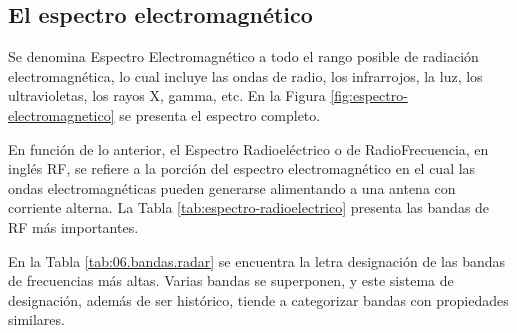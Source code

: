 \begin{description}




\end{description}


\subsection{El espectro electromagn\'etico}

Se denomina Espectro Electromagn\'etico a todo el rango posible de radiaci\'on electromagn\'etica, lo cual incluye las ondas de radio, los infrarrojos, la luz, los ultravioletas, los rayos X, gamma, etc.
  En la Figura \ref{fig:espectro-electromagnetico} se presenta el espectro completo.

En funci\'on de lo anterior, el Espectro Radioel\'ectrico o de RadioFrecuencia, 
 en ingl\'es \ac{RF},
 se refiere a la porci\'on del espectro electromagn\'etico en el cual las ondas electromagn\'eticas pueden generarse alimentando a una antena con corriente alterna. La Tabla \ref{tab:espectro-radioelectrico}   presenta las bandas de RF m\'as importantes.

 En la Tabla \ref{tab:06.bandas.radar} se encuentra la letra designación de las bandas de frecuencias más altas. Varias bandas se superponen, y este sistema de designación, además de ser
histórico, tiende a categorizar bandas con propiedades similares.



